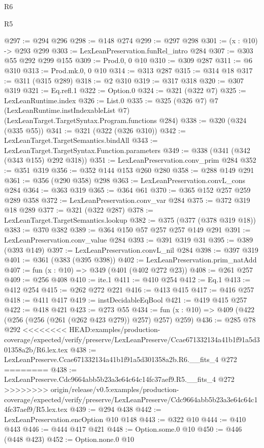 \begin{lexlean}{R6}
\begin{lexlean}{R5}
\begin{coremodule}
{{{{{{{{{@297 := @294 @296
@298 := @148 @274
@299 := @297 @298
@301 := (x : @10) -> @293 @299
@303 := LexLeanPreservation.funRel_intro @284
@307 := @303 @55 @292 @299 @155
@309 := Prod.{0, 0} @10
@310 := @309 @287
@311 := @6 @310
@313 := Prod.mk.{0, 0} @10
@314 := @313 @287
@315 := @314 @18
@317 := @311 (@315 @289)
@318 := @2 @310
@319 := @317 @318
@320 := @307 @319
@321 := Eq.refl.{1}
@322 := Option.{0}
@324 := @321 (@322 @7)
@325 := LexLeanRuntime.index
@326 := List.{0}
@335 := @325
    (@326 @7)
    @7
    (LexLeanRuntime.instIndexableList @7)
    (LexLeanTarget.TargetSyntax.Program.functions @284)
@338 := @320 (@324 (@335 @55))
@341 := @321 (@322 (@326 @310))
@342 := LexLeanTarget.TargetSemantics.bindAll
@343 := LexLeanTarget.TargetSyntax.Function.parameters
@349 := @338 (@341 (@342 (@343 @155) @292 @318))
@351 := LexLeanPreservation.conv_prim @284
@352 := @351 @319
@356 := @352 @144 @153 @260 @280
@358 := @288 @149 @291
@361 := @356 (@290 @358) @298
@363 := LexLeanPreservation.convL_cons @284
@364 := @363 @319
@365 := @364 @61
@370 := @365 @152 @257 @259 @289 @358
@372 := LexLeanPreservation.conv_var @284
@375 := @372 @319 @18 @289
@377 := @321 (@322 @287)
@378 := LexLeanTarget.TargetSemantics.lookup
@382 := @375 (@377 (@378 @319 @18))
@383 := @370 @382
@389 := @364 @150 @57 @257 @257 @149 @291
@391 := LexLeanPreservation.conv_value @284
@393 := @391 @319 @31
@395 := @389 (@393 @149)
@397 := LexLeanPreservation.convL_nil @284
@398 := @397 @319
@401 := @361 (@383 (@395 @398))
@402 := LexLeanPreservation.prim_natAdd
@407 := fun (x : @10) => @349 (@401 (@402 @272 @23))
@408 := @261 @257
@409 := @256 @408
@410 := ite.{1}
@411 := @410 @254
@412 := Eq.{1}
@413 := @412 @254
@415 := @262 @272 @221
@416 := @413 @415
@417 := @416 @257
@418 := @411 @417
@419 := instDecidableEqBool
@421 := @419 @415 @257
@422 := @418 @421
@423 := @273 @55
@434 := fun (x : @10) => @409 (@422 (@256 (@256 (@261 (@262 @423 @279)) @257) @257) @259)
@436 := @285 @78 @292
<<<<<<<< HEAD:examples/production-coverage/expected/verify/preserve/LexLeanPreserve/Ccae671332134a41b1f91a5d301358a2b/R6.lex.tex
@438 := LexLeanPreserve.Ccae671332134a41b1f91a5d301358a2b.R6.__fits_4 @272
========
@438 := LexLeanPreserve.Cdc9664abb5b23a3e64c64c14fc37aef9.R5.__fits_4 @272
>>>>>>>> origin/release/v0.5:examples/production-coverage/expected/verify/preserve/LexLeanPreserve/Cdc9664abb5b23a3e64c64c14fc37aef9/R5.lex.tex
@439 := @294 @438
@442 := LexLeanPreservation.encOption @10 @148
@443 := @322 @10
@444 := @410 @443
@446 := @444 @417 @421
@448 := Option.some.{0} @10
@450 := @446 (@448 @423)
@452 := Option.none.{0} @10
}}}}}}}}}
\end{coremodule}
\end{lexlean}
\end{lexlean}
